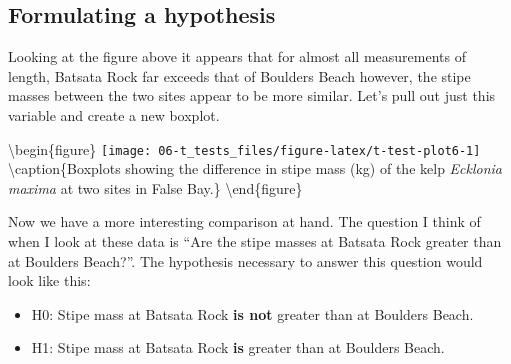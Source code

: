 \documentclass[english,10pt,a4paper,oneside]{book}
\providecommand{\tightlist}{%
  \setlength{\itemsep}{0pt}\setlength{\parskip}{0pt}}
\newenvironment{Shaded}{\begin{snugshade}}{\end{snugshade}}
\newcommand{\CommentTok}[1]{\textcolor[rgb]{0.56,0.35,0.01}{\textit{#1}}}
\newcommand{\DataTypeTok}[1]{\textcolor[rgb]{0.13,0.29,0.53}{#1}}
\newcommand{\KeywordTok}[1]{\textcolor[rgb]{0.13,0.29,0.53}{\textbf{#1}}}
\newcommand{\NormalTok}[1]{#1}
\newcommand{\OperatorTok}[1]{\textcolor[rgb]{0.81,0.36,0.00}{\textbf{#1}}}
\newcommand{\StringTok}[1]{\textcolor[rgb]{0.31,0.60,0.02}{#1}}
\theoremstyle{definition}
\theoremstyle{definition}
\theoremstyle{definition}
\theoremstyle{remark}
\begin{document}
\hypertarget{formulating-a-hypothesis}{%
\subsection{Formulating a hypothesis}\label{formulating-a-hypothesis}}

Looking at the figure above it appears that for almost all measurements
of length, Batsata Rock far exceeds that of Boulders Beach however, the
stipe masses between the two sites appear to be more similar. Let's pull
out just this variable and create a new boxplot.

\begin{Shaded}
\end{Shaded}

\textbackslash{}begin\{figure\}
\texttt{[image: 06-t\_tests\_files/figure-latex/t-test-plot6-1]}
\textbackslash{}caption\{Boxplots showing the difference in stipe mass
(kg) of the kelp \emph{Ecklonia maxima} at two sites in False
Bay.\}\label{fig:t-test-plot6} \textbackslash{}end\{figure\}

Now we have a more interesting comparison at hand. The question I think
of when I look at these data is \enquote{Are the stipe masses at Batsata
Rock greater than at Boulders Beach?}. The hypothesis necessary to
answer this question would look like this:

\begin{itemize}
\tightlist
\item
  H0: Stipe mass at Batsata Rock \textbf{is not} greater than at
  Boulders Beach.
\item
  H1: Stipe mass at Batsata Rock \textbf{is} greater than at Boulders
  Beach.
\end{itemize}
\end{document}

